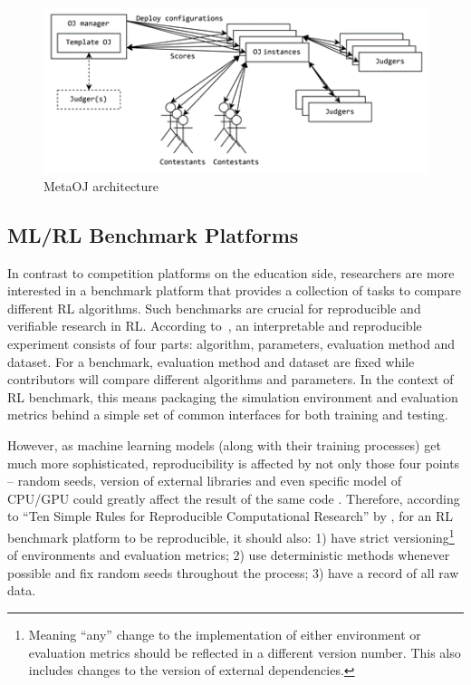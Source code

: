 \begin{figure}[H]
    \centering
    \includegraphics{images/metaoj.png}
    \caption{MetaOJ architecture}
    \label{fig:metaoj}
\end{figure}

\subsection{ML/RL Benchmark Platforms}
In contrast to competition platforms on the education side, researchers are more interested in a benchmark platform that provides a collection of tasks to compare different RL algorithms. Such benchmarks are crucial for reproducible and verifiable research in RL. According to~\cite{RN20}, an interpretable and reproducible experiment consists of four parts: algorithm, parameters, evaluation method and dataset. For a benchmark, evaluation method and dataset are fixed while contributors will compare different algorithms and parameters. In the context of RL benchmark, this means packaging the simulation environment and evaluation metrics behind a simple set of common interfaces for both training and testing.

However, as machine learning models (along with their training processes) get much more sophisticated, reproducibility is affected by not only those four points – random seeds, version of external libraries and even specific model of CPU/GPU could greatly affect the result of the same code \cite{RN21}. Therefore, according to “Ten Simple Rules for Reproducible Computational Research” by \cite{RN22}, for an RL benchmark platform to be reproducible, it should also: 1) have strict versioning\footnote{Meaning “any” change to the implementation of either environment or evaluation metrics should be reflected in a different version number. This also includes changes to the version of external dependencies.} of environments and evaluation metrics; 2) use deterministic methods whenever possible and fix random seeds throughout the process; 3) have a record of all raw data.

